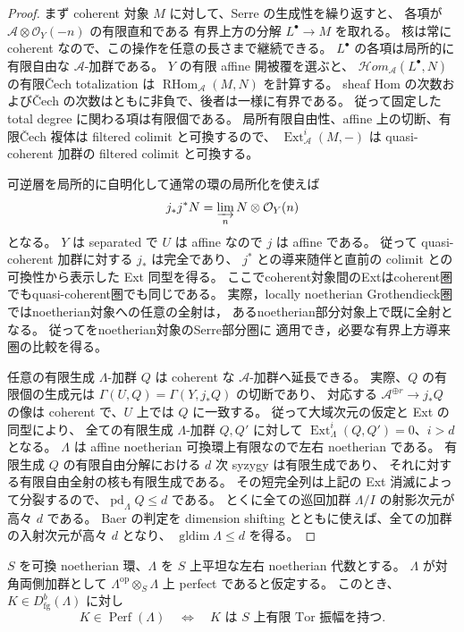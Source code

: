 \begin{proof}
まず coherent 対象 $M$ に対して、Serre の生成性を繰り返すと、
各項が $\mathscr A\otimes\mathcal O_Y(-n)$ の有限直和である
有界上方の分解 $L^\bullet\to M$ を取れる。
核は常に coherent なので、この操作を任意の長さまで継続できる。
$L^\bullet$ の各項は局所的に有限自由な $\mathscr A$-加群である。
$Y$ の有限 affine 開被覆を選ぶと、
$\mathcal Hom_{\mathscr A}(L^\bullet,N)$ の有限\v{C}ech totalization は
$\operatorname{RHom}_{\mathscr A}(M,N)$ を計算する。
sheaf Hom の次数および\v{C}ech の次数はともに非負で、後者は一様に有界である。
従って固定した total degree に関わる項は有限個である。
局所有限自由性、affine 上の切断、有限\v{C}ech 複体は filtered colimit と可換するので、
$\operatorname{Ext}^i_{\mathscr A}(M,-)$ は quasi-coherent 加群の filtered colimit と可換する。

可逆層を局所的に自明化して通常の環の局所化を使えば
\[
 j_*j^*N=\varinjlim_n N\otimes\mathcal O_Y(n)
\]
となる。
$Y$ は separated で $U$ は affine なので $j$ は affine である。
従って quasi-coherent 加群に対する $j_*$ は完全であり、
$j^*$ との導来随伴と直前の colimit との可換性から表示した Ext 同型を得る。
ここでcoherent対象間のExtはcoherent圏でもquasi-coherent圏でも同じである。
実際，locally noetherian Grothendieck圏ではnoetherian対象への任意の全射は，
あるnoetherian部分対象上で既に全射となる。
従って\cite[Lemma~13.17.4, Tag~0FCL]{StacksAbel}をnoetherian対象のSerre部分圏に
適用でき，必要な有界上方導来圏の比較を得る。

任意の有限生成 $\Lambda$-加群 $Q$ は coherent な $\mathscr A$-加群へ延長できる。
実際、$Q$ の有限個の生成元は
$\Gamma(U,Q)=\Gamma(Y,j_*Q)$ の切断であり、
対応する $\mathscr A^{\oplus r}\to j_*Q$ の像は coherent で、$U$ 上では $Q$ に一致する。
従って大域次元の仮定と Ext の同型により、
全ての有限生成 $\Lambda$-加群 $Q,Q'$ に対して
$\operatorname{Ext}^{i}_\Lambda(Q,Q')=0$、$i>d$ となる。
$\Lambda$ は affine noetherian 可換環上有限なので左右 noetherian である。
有限生成 $Q$ の有限自由分解における $d$ 次 syzygy は有限生成であり、
それに対する有限自由全射の核も有限生成である。
その短完全列は上記の Ext 消滅によって分裂するので、$\operatorname{pd}_\Lambda Q\leq d$ である。
とくに全ての巡回加群 $\Lambda/I$ の射影次元が高々 $d$ である。
Baer の判定を dimension shifting とともに使えば、全ての加群の入射次元が高々 $d$ となり、
$\operatorname{gldim}\Lambda\leq d$ を得る。
\end{proof}

\begin{lemma}
\label{lem:relative-diagonal-finite-tor}
$S$ を可換 noetherian 環、$\Lambda$ を $S$ 上平坦な左右 noetherian 代数とする。
$\Lambda$ が対角両側加群として
$\Lambda^{\mathrm{op}}\otimes_S\Lambda$ 上 perfect であると仮定する。
このとき、$K\in D^b_{\mathrm{fg}}(\Lambda)$ に対し
\[
 K\in\operatorname{Perf}(\Lambda)
 \quad\Longleftrightarrow\quad
 K\text{ は }S\text{ 上有限 Tor 振幅を持つ}.
\]
\end{lemma}

